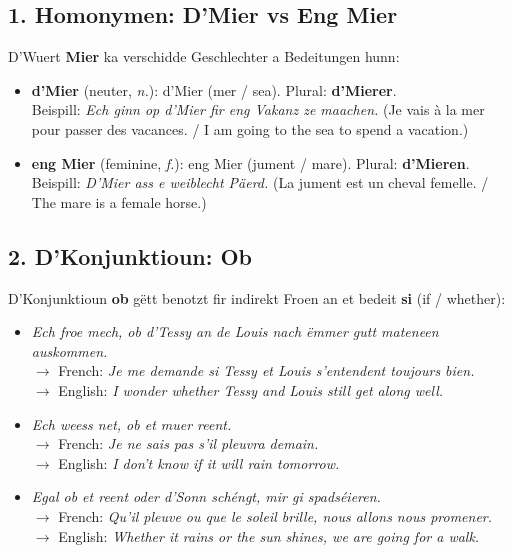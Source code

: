 \subsection*{1. Homonymen: D'Mier vs Eng Mier}
D'Wuert \textbf{Mier} ka verschidde Geschlechter a Bedeitungen hunn:
\begin{itemize}
    \item \textbf{d'Mier} (neuter, \textit{n.}): d'Mier (mer / sea). Plural: \textbf{d'Mierer}. \\
    Beispill: \textit{Ech ginn op d’Mier fir eng Vakanz ze maachen.} (Je vais à la mer pour passer des vacances. / I am going to the sea to spend a vacation.)
    
    \item \textbf{eng Mier} (feminine, \textit{f.}): eng Mier (jument / mare). Plural: \textbf{d'Mieren}. \\
    Beispill: \textit{D'Mier ass e weiblecht Päerd.} (La jument est un cheval femelle. / The mare is a female horse.)
\end{itemize}

\subsection*{2. D'Konjunktioun: Ob}
D'Konjunktioun \textbf{ob} gëtt benotzt fir indirekt Froen an et bedeit \textbf{si} (if / whether):
\begin{itemize}
    \item \textit{Ech froe mech, ob d'Tessy an de Louis nach ëmmer gutt mateneen auskommen.} \\
    $\rightarrow$ French: \textit{Je me demande si Tessy et Louis s'entendent toujours bien.} \\
    $\rightarrow$ English: \textit{I wonder whether Tessy and Louis still get along well.}
    
    \item \textit{Ech weess net, ob et muer reent.} \\
    $\rightarrow$ French: \textit{Je ne sais pas s'il pleuvra demain.} \\
    $\rightarrow$ English: \textit{I don't know if it will rain tomorrow.}
    
    \item \textit{Egal ob et reent oder d'Sonn schéngt, mir gi spadséieren.} \\
    $\rightarrow$ French: \textit{Qu'il pleuve ou que le soleil brille, nous allons nous promener.} \\
    $\rightarrow$ English: \textit{Whether it rains or the sun shines, we are going for a walk.}
\end{itemize}

